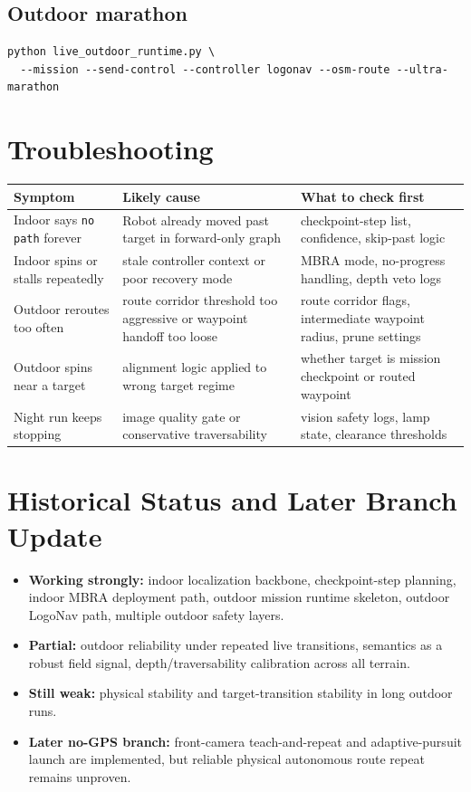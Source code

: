 \documentclass[11pt]{article}
\begin{document}
\subsection*{Outdoor marathon}

\begin{verbatim}
python live_outdoor_runtime.py \
  --mission --send-control --controller logonav --osm-route --ultra-marathon
\end{verbatim}

\section{Troubleshooting}

\begin{longtable}{p{}p{}p{}}
\toprule
\textbf{Symptom} & \textbf{Likely cause} & \textbf{What to check first} \\
\midrule
Indoor says \texttt{no path} forever & Robot already moved past target in forward-only graph & checkpoint-step list, confidence, skip-past logic \\
Indoor spins or stalls repeatedly & stale controller context or poor recovery mode & MBRA mode, no-progress handling, depth veto logs \\
Outdoor reroutes too often & route corridor threshold too aggressive or waypoint handoff too loose & route corridor flags, intermediate waypoint radius, prune settings \\
Outdoor spins near a target & alignment logic applied to wrong target regime & whether target is mission checkpoint or routed waypoint \\
Night run keeps stopping & image quality gate or conservative traversability & vision safety logs, lamp state, clearance thresholds \\
\bottomrule
\end{longtable}

\section{Historical Status and Later Branch Update}

\begin{itemize}[nosep]
  \item \textbf{Working strongly:} indoor localization backbone, checkpoint-step
  planning, indoor MBRA deployment path, outdoor mission runtime skeleton, outdoor
  LogoNav path, multiple outdoor safety layers.
  \item \textbf{Partial:} outdoor reliability under repeated live transitions,
  semantics as a robust field signal, depth/traversability calibration across all
  terrain.
  \item \textbf{Still weak:} physical stability and target-transition stability in
  long outdoor runs.
  \item \textbf{Later no-GPS branch:} front-camera teach-and-repeat and
  adaptive-pursuit launch are implemented, but reliable physical autonomous
  route repeat remains unproven.
\end{itemize}
\end{document}

